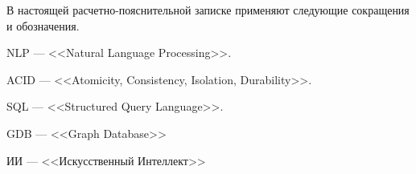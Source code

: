 
В настоящей расчетно-пояснительной записке применяют следующие сокращения и обозначения.\\

\begin{description}	
	\item{NLP} --- <<Natural Language Processing>>.
	\item{ACID} --- <<Atomicity, Consistency, Isolation, Durability>>.
	\item{SQL} --- <<Structured Query Language>>.
	\item{GDB} --- <<Graph Database>>
	\item{ИИ} --- <<Искусственный Интеллект>>
\end{description}
